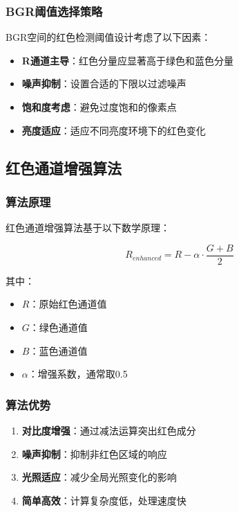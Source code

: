 \documentclass[12pt]{article}
\begin{document}
\subsubsection{BGR阈值选择策略}

BGR空间的红色检测阈值设计考虑了以下因素：

\begin{itemize}
    \item \textbf{R通道主导}：红色分量应显著高于绿色和蓝色分量
    \item \textbf{噪声抑制}：设置合适的下限以过滤噪声
    \item \textbf{饱和度考虑}：避免过度饱和的像素点
    \item \textbf{亮度适应}：适应不同亮度环境下的红色变化
\end{itemize}

\subsection{红色通道增强算法}

\subsubsection{算法原理}

红色通道增强算法基于以下数学原理：

\begin{equation}
R_{enhanced} = R - \alpha \cdot \frac{G + B}{2}
\end{equation}

其中：
\begin{itemize}
    \item $R$：原始红色通道值
    \item $G$：绿色通道值
    \item $B$：蓝色通道值
    \item $\alpha$：增强系数，通常取0.5
\end{itemize}

\subsubsection{算法优势}

\begin{enumerate}
    \item \textbf{对比度增强}：通过减法运算突出红色成分
    \item \textbf{噪声抑制}：抑制非红色区域的响应
    \item \textbf{光照适应}：减少全局光照变化的影响
    \item \textbf{简单高效}：计算复杂度低，处理速度快
\end{enumerate}
\end{document}
